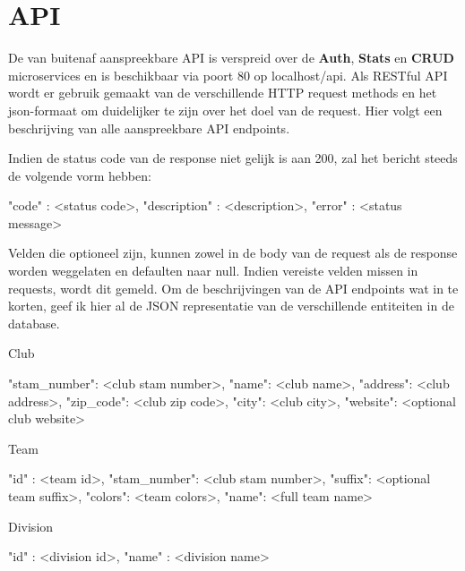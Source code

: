 \documentclass[10pt]{article}
\begin{document}
\clearpage
\section{API}
De van buitenaf aanspreekbare API is verspreid over de \textbf{Auth}, \textbf{Stats} en \textbf{CRUD} microservices en is beschikbaar via poort 80 op localhost/api. Als RESTful API wordt er gebruik gemaakt van de verschillende HTTP request methods en het json-formaat om duidelijker te zijn over het doel van de request. Hier volgt een beschrijving van alle aanspreekbare API endpoints.

\noindent Indien de status code van de response niet gelijk is aan 200, zal het bericht steeds de volgende vorm hebben:

\vspace{2em}
\begin{routeResponseItemBody}
{ 
	"code" : <status code>,
	"description" : <description>,
	"error" : <status message>
}
\end{routeResponseItemBody}

\noindent Velden die optioneel zijn, kunnen zowel in de body van de request als de response worden weggelaten en defaulten naar null. Indien vereiste velden missen in requests, wordt dit gemeld. Om de beschrijvingen van de API endpoints wat in te korten, geef ik hier al de JSON representatie van de verschillende entiteiten in de database.


Club
\vspace{2em}
\begin{routeResponseItemBody}
{ 
	"stam_number": <club stam number>,
	"name": <club name>,
	"address": <club address>,
	"zip_code": <club zip code>,
	"city": <club city>,
	"website": <optional club website>
}
\end{routeResponseItemBody}

Team
\vspace{2em}
\begin{routeResponseItemBody}
{ 
	"id" : <team id>,
	"stam_number": <club stam number>,
	"suffix": <optional team suffix>,
	"colors": <team colors>,
	"name": <full team name>
}
\end{routeResponseItemBody}

Division
\vspace{2em}
\begin{routeResponseItemBody}
{ 
	"id" : <division id>,
	"name" : <division name>
}
\end{routeResponseItemBody}
\end{document}
